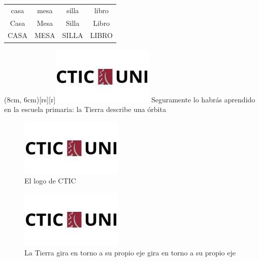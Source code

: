 \documentclass{report}
\begin{document}
\begin{tabular}{cccc}
	\hline
	casa & mesa & silla & libro \\
	Casa & Mesa & Silla & Libro \\
	CASA & MESA & SILLA & LIBRO \\
	\hline
\end{tabular}

	
\newpage

\parpic(8cm, 6cm)[rs][r]{\includegraphics{ctic}}%
Seguramente lo habrás aprendido en la escuela primaria: la Tierra describe una ór\-bita
\lipsum[1]

\begin{figure}
\centering
\includegraphics{ctic}
\caption*{El logo de CTIC}
\end{figure}
\lipsum[1-5]

\begin{figure}
\includegraphics[scale=0.7]{ctic}
\caption{La Tierra gira en torno a su propio eje gira en torno a su propio eje}
\end{figure}
\end{document}
